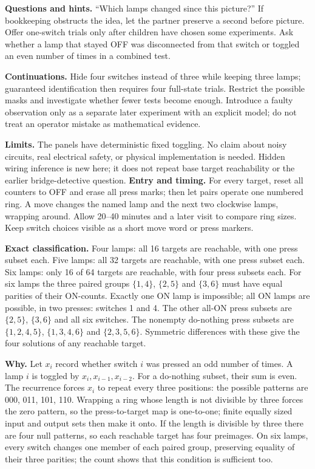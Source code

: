\textbf{Questions and hints.} ``Which lamps changed since this picture?'' If bookkeeping obstructs the idea, let the partner preserve a second before picture. Offer one-switch trials only after children have chosen some experiments. Ask whether a lamp that stayed OFF was disconnected from that switch or toggled an even number of times in a combined test.

\textbf{Continuations.} Hide four switches instead of three while keeping three lamps; guaranteed identification then requires four full-state trials. Restrict the possible masks and investigate whether fewer tests become enough. Introduce a faulty observation only as a separate later experiment with an explicit model; do not treat an operator mistake as mathematical evidence.

\textbf{Limits.} The panels have deterministic fixed toggling. No claim about noisy circuits, real electrical safety, or physical implementation is needed. Hidden wiring inference is new here; it does not repeat base target reachability or the earlier bridge-detective question.
\newpage
{}
\textbf{Entry and timing.} For every target, reset all counters to OFF and erase all press marks; then let pairs operate one numbered ring. A move changes the named lamp and the next two clockwise lamps, wrapping around. Allow 20--40 minutes and a later visit to compare ring sizes. Keep switch choices visible as a short move word or press markers.

\textbf{Exact classification.} Four lamps: all 16 targets are reachable, with one press subset each. Five lamps: all 32 targets are reachable, with one press subset each. Six lamps: only 16 of 64 targets are reachable, with four press subsets each. For six lamps the three paired groups $\{1,4\}$, $\{2,5\}$ and $\{3,6\}$ must have equal parities of their ON-counts. Exactly one ON lamp is impossible; all ON lamps are possible, in two presses: switches 1 and 4. The other all-ON press subsets are $\{2,5\}$, $\{3,6\}$ and all six switches. The nonempty do-nothing press subsets are $\{1,2,4,5\}$, $\{1,3,4,6\}$ and $\{2,3,5,6\}$. Symmetric differences with these give the four solutions of any reachable target.

\textbf{Why.} Let $x_i$ record whether switch $i$ was pressed an odd number of times. A lamp $i$ is toggled by $x_i,x_{i-1},x_{i-2}$. For a do-nothing subset, their sum is even. The recurrence forces $x_i$ to repeat every three positions: the possible patterns are 000, 011, 101, 110. Wrapping a ring whose length is not divisible by three forces the zero pattern, so the press-to-target map is one-to-one; finite equally sized input and output sets then make it onto. If the length is divisible by three there are four null patterns, so each reachable target has four preimages. On six lamps, every switch changes one member of each paired group, preserving equality of their three parities; the count shows that this condition is sufficient too.

